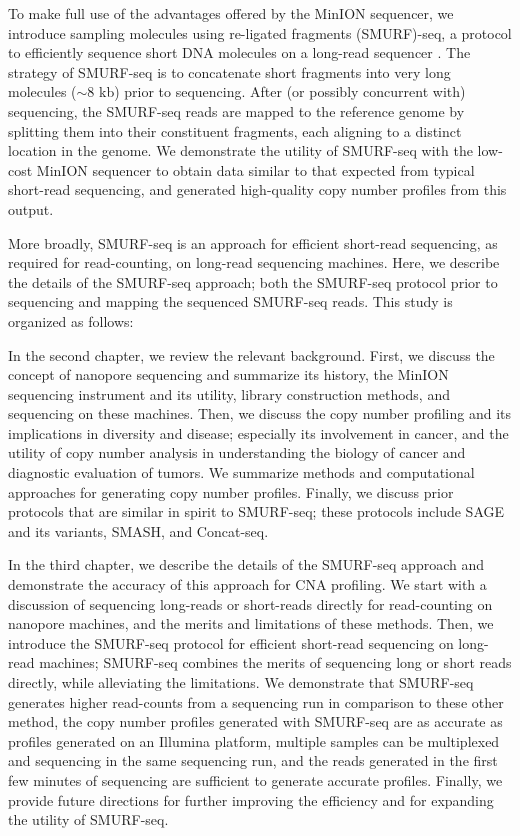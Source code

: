 To make full use of the advantages offered by the MinION sequencer, we
introduce sampling molecules using re-ligated fragments (SMURF)-seq, a
protocol to efficiently sequence short DNA molecules on a long-read
sequencer \citep{prabakar2019smurf}. The strategy of SMURF-seq is to
concatenate short fragments into very long molecules ($\sim$8 kb) prior
to sequencing. After (or possibly concurrent with) sequencing, the
SMURF-seq reads are mapped to the reference genome by splitting them
into their constituent fragments, each aligning to a distinct location
in the genome.
%
We demonstrate the utility of SMURF-seq with the low-cost MinION
sequencer to obtain data similar to that expected from typical
short-read sequencing, and generated high-quality copy number profiles
from this output.

More broadly, SMURF-seq is an approach for efficient short-read
sequencing, as required for read-counting, on long-read sequencing
machines. Here, we describe the details of the SMURF-seq approach; both
the SMURF-seq protocol prior to sequencing and mapping the sequenced
SMURF-seq reads. This study is organized as follows:

In the second chapter, we review the relevant background.  First, we
discuss the concept of nanopore sequencing and summarize its history,
the MinION sequencing instrument and its utility, library construction
methods, and sequencing on these machines.
%
Then, we discuss the copy number profiling and its implications in
diversity and disease; especially its involvement in cancer, and the
utility of copy number analysis in understanding the biology of cancer
and diagnostic evaluation of tumors. We summarize methods and
computational approaches for generating copy number profiles.
%
Finally, we discuss prior protocols that are similar in spirit to
SMURF-seq; these protocols include SAGE and its variants, SMASH, and
Concat-seq.

In the third chapter, we describe the details of the SMURF-seq approach
and demonstrate the accuracy of this approach for CNA profiling.  We
start with a discussion of sequencing long-reads or short-reads directly
for read-counting on nanopore machines, and the merits and limitations
of these methods.
%
Then, we introduce the SMURF-seq protocol for efficient short-read
sequencing on long-read machines; SMURF-seq combines the merits of
sequencing long or short reads directly, while alleviating the
limitations.
%
We demonstrate that SMURF-seq generates higher read-counts from a
sequencing run in comparison to these other method, the copy number
profiles generated with SMURF-seq are as accurate as profiles generated
on an Illumina platform, multiple samples can be multiplexed and
sequencing in the same sequencing run, and the reads generated in the
first few minutes of sequencing are sufficient to generate accurate
profiles.
%
Finally, we provide future directions for further improving the
efficiency and for expanding the utility of SMURF-seq.

